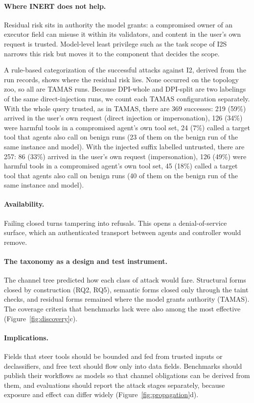 \documentclass[pdflatex,sn-mathphys-num]{sn-jnl}
\theoremstyle{thmstyleone}%
\theoremstyle{thmstyletwo}%
\theoremstyle{thmstylethree}%
\begin{document}
\paragraph{Where INERT does not help.} Residual risk sits in authority the model grants: a compromised owner of an executor field can misuse it within its validators, and content in the user's own request is trusted. Model-level least privilege such as the task scope of I2S narrows this risk but moves it to the component that decides the scope.

A rule-based categorization of the successful attacks against I2, derived from the run records, shows where the residual risk lies. None occurred on the topology zoo, so all are TAMAS runs. Because DPI-whole and DPI-split are two labelings of the same direct-injection runs, we count each TAMAS configuration separately. With the whole query trusted, as in TAMAS, there are 369 successes: 219 (59\%) arrived in the user's own request (direct injection or impersonation), 126 (34\%) were harmful tools in a compromised agent's own tool set, 24 (7\%) called a target tool that agents also call on benign runs (23 of them on the benign run of the same instance and model). With the injected suffix labelled untrusted, there are 257: 86 (33\%) arrived in the user's own request (impersonation), 126 (49\%) were harmful tools in a compromised agent's own tool set, 45 (18\%) called a target tool that agents also call on benign runs (40 of them on the benign run of the same instance and model).

\paragraph{Availability.} Failing closed turns tampering into refusals. This opens a denial-of-service surface, which an authenticated transport between agents and controller would remove.

\paragraph{The taxonomy as a design and test instrument.} The channel tree predicted how each class of attack would fare. Structural forms closed by construction (RQ2, RQ5), semantic forms closed only through the taint checks, and residual forms remained where the model grants authority (TAMAS). The coverage criteria that benchmarks lack were also among the most effective (Figure~\ref{fig:discovery}c).

\paragraph{Implications.} Fields that steer tools should be bounded and fed from trusted inputs or declassifiers, and free text should flow only into data fields. Benchmarks should publish their workflows as models so that channel obligations can be derived from them, and evaluations should report the attack stages separately, because exposure and effect can differ widely (Figure~\ref{fig:propagation}d).
\end{document}
